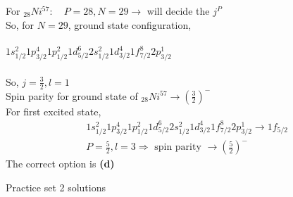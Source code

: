 \begin{enumerate}
\begin{answer}
	For ${ }_{28} N i^{57}: \quad P=28, N=29 \rightarrow$ will decide the $j^{P}$\\
	So, for $N=29$, ground state configuration,\\\\
	$1 s_{1 / 2}^{2} 1 p_{3 / 2}^{4} 1 p_{1 / 2}^{2} 1 d_{5 / 2}^{6} 2 s_{1 / 2}^{2} 1 d_{3 / 2}^{4} 1 f_{7 / 2}^{8} 2 p_{3 / 2}^{1}$\\\\
	So, $j=\frac{3}{2}, l=1$\\
	Spin parity for ground state of ${ }_{28} N i^{57} \rightarrow\left(\frac{3}{2}\right)^{-}$\\
	For first excited state,\\
	\begin{align*}
		&1 s_{1 / 2}^{2} 1 p_{3 / 2}^{4} 1 p_{1 / 2}^{2} 1 d_{5 / 2}^{6} 2 s_{1 / 2}^{2} 1 d_{3 / 2}^{4} 1 f_{7 / 2}^{8} 2 p_{3 / 2}^{1} \rightarrow 1 f_{5 / 2} \\
		&P=\frac{5}{2}, l=3 \Rightarrow \text { spin parity } \rightarrow\left(\frac{5}{2}\right)^{-}
	\end{align*}
The correct option is \textbf{(d)}
\end{answer}
\end{enumerate}
\newpage
\begin{abox}
	Practice set 2 solutions
	\end{abox}
